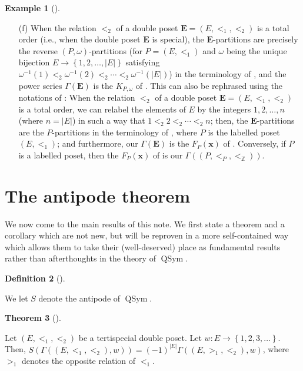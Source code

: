 \documentclass[numbers=enddot,12pt,final,onecolumn,notitlepage,abstracton]{scrartcl}%
\theoremstyle{definition}
\newtheorem{theo}{Theorem}[section]
\newenvironment{theorem}[1][]
{\begin{theo}[#1]\begin{leftbar}}
{\end{leftbar}\end{theo}}
\newtheorem{defi}[theo]{Definition}
\newenvironment{definition}[1][]
{\begin{defi}[#1]\begin{leftbar}}
{\end{leftbar}\end{defi}}
\newtheorem{exam}[theo]{Example}
\newenvironment{example}[1][]
{\begin{exam}[#1]\begin{leftbar}}
{\end{leftbar}\end{exam}}
\newcommand{\xx}{{\mathbf{x}}}
\newcommand{\QSym}{{\operatorname{QSym}}}
\newcommand{\EE}{{\mathbf{E}}}
\newcommand{\ZZ}{{\mathbb{Z}}}
\begin{document}
\begin{example}
\begin{enumerate}
\item[(f)] When the relation $<_2$ of a double poset
$\EE = \left(E, <_1, <_2\right)$ is a total order (i.e.,
when the double poset $\EE$ is special), the
$\EE$-partitions are precisely the
reverse $\left(P, \omega\right)$-partitions (for
$P = \left(E, <_1\right)$ and $\omega$ being the unique
bijection $E \to \left\{1,2,\ldots,\left|E\right|\right\}$
satisfying
$\omega^{-1}\left(1\right) <_2 \omega^{-1}\left(2\right) <_2 \cdots
<_2 \omega^{-1}\left(\left|E\right|\right)$)
in the terminology
of \cite[\S 7.19]{Stanley-EC2}, and the power series
$\Gamma\left(\EE\right)$ is the $K_{P, \omega}$ of
\cite[\S 7.19]{Stanley-EC2}.
This can also be rephrased using
the notations of \cite[\S 5.2]{Reiner}: When the relation $<_2$ of a
double poset $\EE = \left(E, <_1, <_2\right)$ is a total order, we can
relabel the elements of $E$ by the integers $1, 2, \ldots, n$
(where $n = \left|E\right|$) in such
a way that $1 <_2 2 <_2 \cdots <_2 n$; then, the $\EE$-partitions are
the $P$-partitions in the terminology of \cite[Definition 5.12]{Reiner},
where $P$ is the labelled poset $\left(E, <_1\right)$; and furthermore,
our $\Gamma\left(\EE\right)$ is the $F_P\left(\xx\right)$ of
\cite[Definition 5.12]{Reiner}. Conversely, if $P$ is a labelled poset, then
the $F_P\left(\xx\right)$ of \cite[Definition 5.12]{Reiner} is our
$\Gamma\left(\left(P, <_P, <_{\ZZ}\right)\right)$.

\end{enumerate}

\end{example}

\section{The antipode theorem}
\label{sect.antipode}

We now come to the main results of this note. We first state a
theorem and a corollary which are not new, but will be reproven in
a more self-contained way which allows them to take their
(well-deserved) place as fundamental results rather than
afterthoughts in the theory of $\QSym$.

\begin{definition}
We let $S$ denote the antipode of $\QSym$.
\end{definition}

\begin{theorem}
\label{thm.antipode.Gammaw}
Let $\left(E, <_1, <_2\right)$ be a tertispecial double poset.
Let $w : E \to \left\{1, 2, 3, \ldots\right\}$. Then,
$S\left(\Gamma\left(\left(E, <_1, <_2\right), w\right)\right)
= \left(-1\right)^{\left|E\right|}
\Gamma\left(\left(E, >_1, <_2\right), w\right)$,
where $>_1$ denotes the opposite relation of $<_1$.
\end{theorem}
\end{document}
